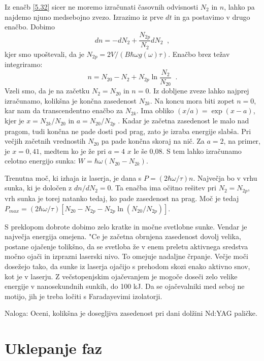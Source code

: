 Iz enačb \ref{5.32} sicer ne moremo izračunati časovnih odvisnosti $%
N_{2}$ in $n$, lahko pa najdemo njuno medsebojno zvezo. Izrazimo iz prve $dt$
in ga postavimo v drugo enačbo. Dobimo 
\begin{equation}
dn=-dN_{2}+\frac{N_{2p}}{N_{2}}dN_{2}\;\;,  \label{5.341}
\end{equation}
kjer smo upoštevali, da je $N_{2p}=2V/(B\hbar \omega g(\omega )\tau )$.
Enačbo brez težav integriramo: 
\begin{equation}
n=N_{20}-N_{2}+N_{2p}\ln \frac{N_{2}}{N_{20}}\;\;.  \label{5.351}
\end{equation}
Vzeli smo, da je na začetku $N_{2}=N_{20}$ in $n=0$. Iz dobljene zveze
lahko najprej izračunamo, kolikšna je končna zasedenost $N_{2k}$. Na
koncu mora biti zopet $n=0$, kar nam da transcendentno enačbo za $N_{2k}$.
Ima obliko $(x/a)=\exp (x-a)$, kjer je $x=N_{2k}/N_{20}$ in $a=N_{20}/N_{2p}$%
. Kadar je začetna zasedenost le malo nad pragom, tudi končna ne pade
dosti pod prag, zato je izraba energije slabša. Pri večjih začetnih
vrednostih $N_{20}$ pa pade končna skoraj na nič. Za $a=2$, na primer,
je $x=0,41$, medtem ko je že pri $a=4$ $x$ le še 0,08. S tem lahko
izračunamo celotno energijo sunka: $W=\hbar \omega (N_{20}-N_{2k})$.

Trenutna moč, ki izhaja iz laserja, je dana s $P=(2\hbar \omega /\tau )n$.
Največja bo v vrhu sunka, ki je določen z $dn/dN_{2}=0$. Ta enačba ima
očitno rešitev pri $N_{2}=N_{2p}$, vrh sunka je torej natanko tedaj, ko
pade zasedenost na prag. Moč je tedaj $P_{max}=(2\hbar \omega /\tau
)[N_{20}-N_{2p}-N_{2p}\ln (N_{20}/N_{2p})]$.

S preklopom dobrote dobimo zelo kratke in močne svetlobne sunke. Vendar je
največja energija omejena. "Ce je začetna obrnjena zasedenost dovolj
velika, postane ojačenje tolikšno, da se svetloba že v enem preletu
aktivnega sredstva močno ojači in izprazni laserski nivo. To omejuje
nadaljne črpanje. Večje moči dosežejo tako, da sunke iz laserja ojačijo
s prehodom skozi enako aktivno snov, kot je v laserju. Z večstopenjskim
ojačevanjem je mogoče doseči zelo velike energije v nanosekundnih sunkih,
do 100 kJ. Da se ojačevalniki med seboj ne motijo, jih je treba ločiti s
Faradayevimi izolatorji.

Naloga: Oceni, kolikšna je dosegljiva zasedenost pri dani dolžini Nd:YAG
paličke.

\section{Uklepanje faz}

